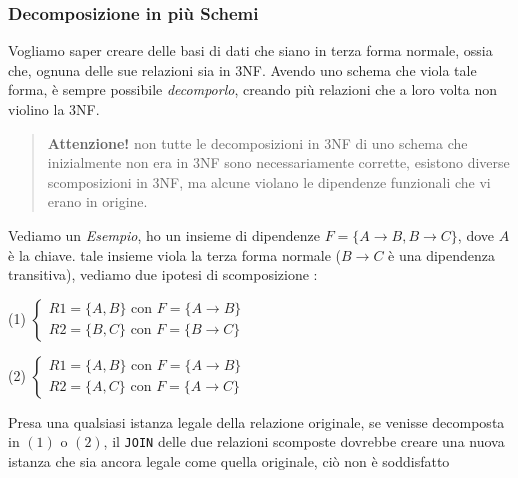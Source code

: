 \documentclass[12pt, letterpaper]{article}
\newcommand{\code}[1]{\colorbox{light-gray}{\texttt{#1}}}
\begin{document}
\subsubsection{Decomposizione in più Schemi}\label{Decomposizione}
Vogliamo saper creare delle basi di dati che siano in terza forma normale, ossia che, ognuna delle sue relazioni sia 
in 3NF. Avendo uno schema che viola tale forma, è sempre possibile \textit{decomporlo}, creando più relazioni che a loro 
volta non violino la 3NF.\begin{quote}
    \textbf{Attenzione!} non tutte le decomposizioni in 3NF di uno schema che inizialmente non era in 3NF sono necessariamente
    corrette, esistono diverse scomposizioni in 3NF, ma alcune violano le dipendenze funzionali che vi erano in origine.
\end{quote}
Vediamo un \textit{Esempio}, ho un insieme di dipendenze \(F=\{A\rightarrow B,B\rightarrow C\}\), dove \(A\) è la chiave. 
tale insieme viola la terza forma normale (\(B\rightarrow C\) è una dipendenza transitiva), vediamo due ipotesi di scomposizione :
\begin{center}
    (1) \(
        \begin{cases}
            R1 = \{A,B\} \text{ con } F=\{A\rightarrow B\}\\
            R2 = \{B,C\} \text{ con } F=\{B\rightarrow C\}
        \end{cases}
    \)
\end{center}
\begin{center}
    (2) \(
        \begin{cases}
            R1 = \{A,B\} \text{ con } F=\{A\rightarrow B\}\\
            R2 = \{A,C\} \text{ con } F=\{A\rightarrow C\}
        \end{cases}
    \)
\end{center}
Presa una qualsiasi istanza legale della relazione originale, se venisse decomposta in \((1)\) o \((2)\), il \code{JOIN} delle 
due relazioni scomposte dovrebbe creare una nuova istanza che sia ancora legale come quella originale, ciò non è soddisfatto 
\end{document}
